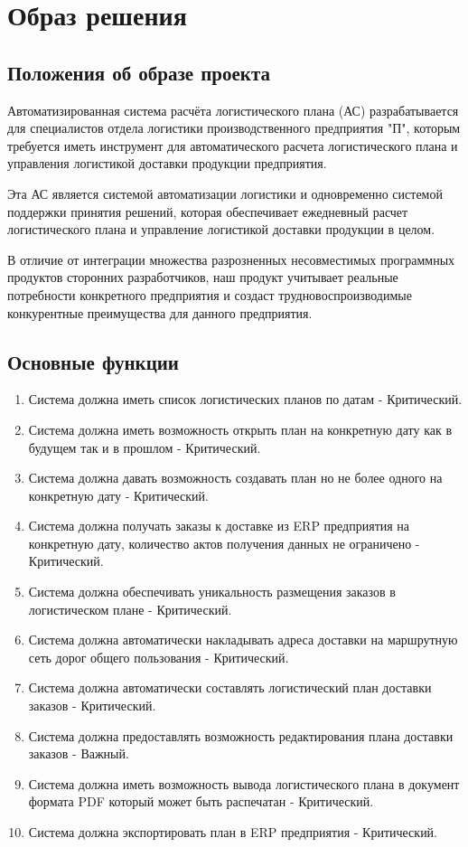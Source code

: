 \chapter{Образ решения}
\label{ch:chap2}


\section{Положения об образе проекта}
\label{sec:vision}

Автоматизированная система расчёта логистического плана (АС) разрабатывается для специалистов отдела логистики производственного предприятия "П",
которым требуется иметь инструмент для автоматического расчета логистического плана и управления логистикой доставки продукции предприятия.

Эта АС является системой автоматизации логистики и одновременно системой поддержки принятия решений,
которая обеспечивает ежедневный расчет логистического плана и управление логистикой доставки продукции в целом.

В отличие от интеграции множества разрозненных несовместимых программных продуктов сторонних разработчиков,
наш продукт учитывает реальные потребности конкретного предприятия и создаст трудновоспроизводимые конкурентные преимущества для данного предприятия.


\section{Основные функции}
\label{sec:fun}

\begin{enumerate}[label=FUN-\arabic*]
    \item Система должна иметь список логистических планов по датам - Критический.
    \item Система должна иметь возможность открыть план на конкретную дату как в будущем так и в прошлом - Критический.
    \item Система должна давать возможность создавать план но не более одного на конкретную дату - Критический.
    \item Система должна получать заказы к доставке из ERP предприятия на конкретную дату, количество актов получения данных не ограничено - Критический.
    \item Система должна обеспечивать уникальность размещения заказов в логистическом плане - Критический.
    \item Система должна автоматически накладывать адреса доставки на маршрутную сеть дорог общего пользования - Критический.
    \item Система должна автоматически составлять логистический план доставки заказов - Критический.
    \item Система должна предоставлять возможность редактирования плана доставки заказов - Важный.
    \item Система должна иметь возможность вывода логистического плана в документ формата PDF который может быть распечатан - Критический.
    \item Система должна экспортировать план в ERP предприятия - Критический.
\end{enumerate}

